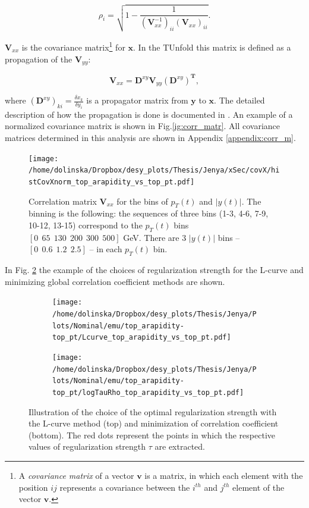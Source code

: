 \begin{equation}
 \rho_{i} = \sqrt{1 - \frac{1}{(\mathbf{V}_{xx}^{-1})_{ii} (\mathbf{V}_{xx})_{ii}}}.
\end{equation}

$\mathbf{V}_{xx}$ is the covariance matrix\footnote{A \textit{covariance matrix} of a vector $\mathbf{v}$ is a matrix, in which each element with the position 
$ij$ represents a covariance between the $i^{th}$ and $j^{th}$ element of the vector $\mathbf{v}$.} for $\mathbf{x}$. In the TUnfold this matrix is defined 
as a propagation of the $\mathbf{V}_{yy}$:

\begin{equation}\label{eq:vxx}
 \mathbf{V}_{xx} = \mathbf{D}^{xy}\mathbf{V}_{yy}(\mathbf{D}^{xy})^{\mathbf{T}},
\end{equation}

where $(\mathbf{D}^{xy})_{ki} = \frac{\delta x_{k}}{\delta y_{i}}$ is a propagator matrix from $\mathbf{y}$ to $\mathbf{x}$. The detailed description
of how the propagation is done is documented in \cite{Schmitt:2012kp}. An example of a normalized covariance matrix is shown in Fig.\ref{ig:corr_matr}.
All covariance matrices determined in this analysis are shown in Appendix \ref{appendix:corr_m}.

\begin{figure}[t]
  \centering
  \texttt{[image: /home/dolinska/Dropbox/desy\_plots/Thesis/Jenya/xSec/covX/histCovXnorm\_top\_arapidity\_vs\_top\_pt.pdf]}
  \caption{Correlation matrix $\mathbf{V}_{xx}$ for the bins of $p_{T}(t)$ and $|y(t)|$. The binning is the following:
  the sequences of three bins (1-3, 4-6, 7-9, 10-12, 13-15) correspond to the $p_{T}(t)$ bins $[0\:\:65\:\:130\:\:200\:\:300\:\:500]$ GeV.
          There are 3 $|y(t)|$ bins -- $[0\:\:0.6\:\:1.2\:\:2.5]$ -- in each $p_{T}(t)$ bin.}
  \label{fig:corr_matr}
\end{figure}

In Fig. \ref{fig:reg_s_m} the example of the choices of regularization strength for the L-curve and minimizing global correlation coefficient 
methods are shown.

\begin{figure}[p]
\centering
\begin{subfigure}
  \centering
  \texttt{[image: /home/dolinska/Dropbox/desy\_plots/Thesis/Jenya/Plots/Nominal/emu/top\_arapidity-top\_pt/Lcurve\_top\_arapidity\_vs\_top\_pt.pdf]}
\end{subfigure}
\begin{subfigure}
  \centering
  \texttt{[image: /home/dolinska/Dropbox/desy\_plots/Thesis/Jenya/Plots/Nominal/emu/top\_arapidity-top\_pt/logTauRho\_top\_arapidity\_vs\_top\_pt.pdf]}
\end{subfigure}
\caption{Illustration of the choice of the optimal regularization strength with the L-curve method (top) and minimization of correlation coefficient
         (bottom). The red dots represent the points in which the respective values of regularization strength $\tau$ are extracted.}
\label{fig:reg_s_m}
\end{figure}

